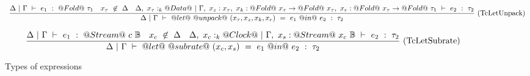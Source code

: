 \begin{figure*}
$$
\enskip \frac {\displaystyle 
    \Delta~|~\Gamma ~\vdash~ e_1~:~@Fold@~\tau_1
    \quad
    x_\tau~\not\in~\Delta
    \quad
    \Delta,~x_\tau :_k @Data@~|~\Gamma,~x_z : x_\tau,~x_k : @Fold@~x_\tau \to @Fold@~x_\tau,~x_r : @Fold@~x_\tau \to @Fold@~\tau_1 ~\vdash~ e_2~:~\tau_2
} {\displaystyle 
    \Delta~|~\Gamma ~\vdash~ @let@~@unpack@~(x_\tau,x_z,x_k,x_r)~=~e_1~@in@~e_2~:~\tau_2
} \  \mbox{(TcLetUnpack)} \enskip
$$

$$
\enskip \frac {\displaystyle 
    \Delta~|~\Gamma ~\vdash~ e_1~:~@Stream@~c~\mathbb{B}
    \quad
    x_c~\not\in~\Delta
    \quad
    \Delta,~x_c :_k @Clock@~|~\Gamma,~x_s : @Stream@~x_c~\mathbb{B} ~\vdash~ e_2~:~\tau_2
} {\displaystyle 
    \Delta~|~\Gamma ~\vdash~ @let@~@subrate@~(x_c,x_s)~=~e_1~@in@~e_2~:~\tau_2
} \  \mbox{(TcLetSubrate)} \enskip
$$


\caption{Types of expressions}
\label{fig:source:type:exp}
\end{figure*}

